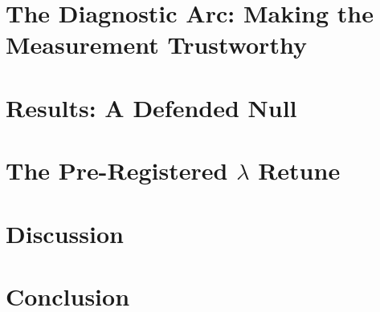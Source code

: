 \documentclass[11pt]{article}
\begin{document}
\section{The Diagnostic Arc: Making the Measurement Trustworthy}
\label{sec:phicpsi:arc}


\section{Results: A Defended Null}
\label{sec:phicpsi:results}


\section{The Pre-Registered $\lambda$ Retune}
\label{sec:phicpsi:prereg}


\section{Discussion}
\label{sec:phicpsi:discussion}


\section{Conclusion}
\label{sec:phicpsi:conclusion}
\end{document}

